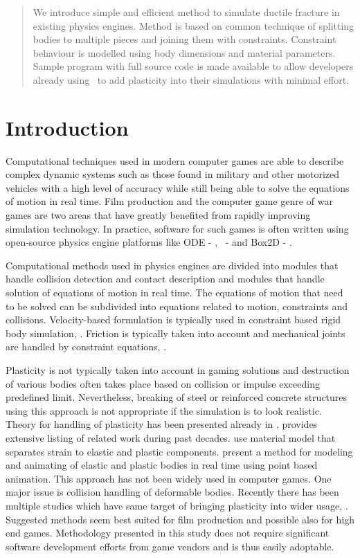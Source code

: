 \begin{abstract}
We introduce simple and efficient method to simulate ductile fracture in existing physics engines.
Method is based on common technique of splitting bodies to multiple pieces and joining them with constraints.
Constraint behaviour is modelled using body dimensions and material parameters.
Sample program with full source code is made available to allow developers already using \cbullet\
to add plasticity into their simulations with minimal effort.
\end{abstract}

\section{Introduction}

Computational techniques used in modern computer games are able to describe
complex dynamic systems such as those found in military and other motorized vehicles
with a high level of accuracy while still being able to solve the equations of motion in real time.
Film production and the computer game genre of war games
are two areas that have greatly benefited from rapidly improving simulation technology. 
In practice, software for such games is often written using open-source physics engine platforms  
like ODE - \cite{ode}, \cbullet\ - \cite{bullet} and Box2D - \cite{box2d}.

Computational methods used in physics engines are divided into modules that handle collision detection and 
contact description and modules that handle solution of equations of motion in real time. 
The equations of motion that need to be 
solved can be subdivided into equations related to motion, constraints and collisions. 
Velocity-based formulation is typically used in constraint based rigid body simulation, \cite{erleben.thesis}. 
Friction is typically taken into account and mechanical joints are handled by constraint equations,
\cite{erleben.thesis}.

Plasticity is not typically taken into account in gaming solutions and 
destruction of various bodies often takes place based on collision or impulse exceeding predefined limit.
Nevertheless, breaking of steel or reinforced concrete structures using this approach 
is not appropriate if the simulation is to look realistic. Theory for handling of plasticity 
has been presented already in \cite{cg1988}. 
\cite{Jones:2016:EPD} provides extensive listing of related work during past decades.
\cite{Obrien:2002:GMA} use material model that separates strain to elastic and plastic components.
\cite{muller2005meshless} 
present a method for modeling and animating of elastic and plastic bodies in real time using 
point based animation. This approach has not been widely used in computer games.  
One major issue is collision handling of deformable bodies.
Recently there has been multiple studies which have same target of bringing plasticity 
into wider usage, \cite{Jones:2016:EPD,Patkar:2015:EDB,Budsberg:2014:EPD}.
Suggested methods seem best suited for film production and possible also for high end games.
Methodology presented in this study does not require significant software development efforts from
game vendors and is thus easily adoptable. 

